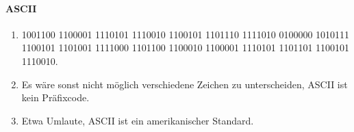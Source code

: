 \documentclass{article}
\begin{document}
\paragraph{ASCII}

\begin{enumerate}
    \item 1001100 1100001 1110101 1110010 1100101 1101110 1111010 0100000 1010111 1100101 1101001 1111000 1101100 1100010 1100001 1110101 1101101 1100101 1110010.
    \item Es wäre sonst nicht möglich verschiedene Zeichen zu unterscheiden, ASCII ist kein Präfixcode.
    \item Etwa Umlaute, ASCII ist ein amerikanischer Standard.
\end{enumerate}
\end{document}
